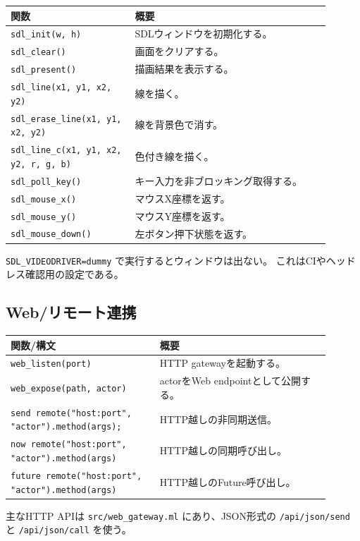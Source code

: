 \documentclass[11pt,a4paper,uplatex,dvipdfmx]{jsarticle}
\begin{document}
\begin{longtable}{p{0.35\linewidth}p{0.55\linewidth}}
\toprule
関数 & 概要 \\
\midrule
\texttt{sdl\_init(w, h)} & SDLウィンドウを初期化する。 \\
\texttt{sdl\_clear()} & 画面をクリアする。 \\
\texttt{sdl\_present()} & 描画結果を表示する。 \\
\texttt{sdl\_line(x1, y1, x2, y2)} & 線を描く。 \\
\texttt{sdl\_erase\_line(x1, y1, x2, y2)} & 線を背景色で消す。 \\
\texttt{sdl\_line\_c(x1, y1, x2, y2, r, g, b)} & 色付き線を描く。 \\
\texttt{sdl\_poll\_key()} & キー入力を非ブロッキング取得する。 \\
\texttt{sdl\_mouse\_x()} & マウスX座標を返す。 \\
\texttt{sdl\_mouse\_y()} & マウスY座標を返す。 \\
\texttt{sdl\_mouse\_down()} & 左ボタン押下状態を返す。 \\
\bottomrule
\end{longtable}

\texttt{SDL\_VIDEODRIVER=dummy} で実行するとウィンドウは出ない。
これはCIやヘッドレス確認用の設定である。

\subsection{Web/リモート連携}

\begin{longtable}{p{0.42\linewidth}p{0.48\linewidth}}
\toprule
関数/構文 & 概要 \\
\midrule
\texttt{web\_listen(port)} & HTTP gatewayを起動する。 \\
\texttt{web\_expose(path, actor)} & actorをWeb endpointとして公開する。 \\
\texttt{send remote("host:port", "actor").method(args);} & HTTP越しの非同期送信。 \\
\texttt{now remote("host:port", "actor").method(args)} & HTTP越しの同期呼び出し。 \\
\texttt{future remote("host:port", "actor").method(args)} & HTTP越しのFuture呼び出し。 \\
\bottomrule
\end{longtable}

主なHTTP APIは \texttt{src/web\_gateway.ml} にあり、JSON形式の
\texttt{/api/json/send} と \texttt{/api/json/call} を使う。
\end{document}
